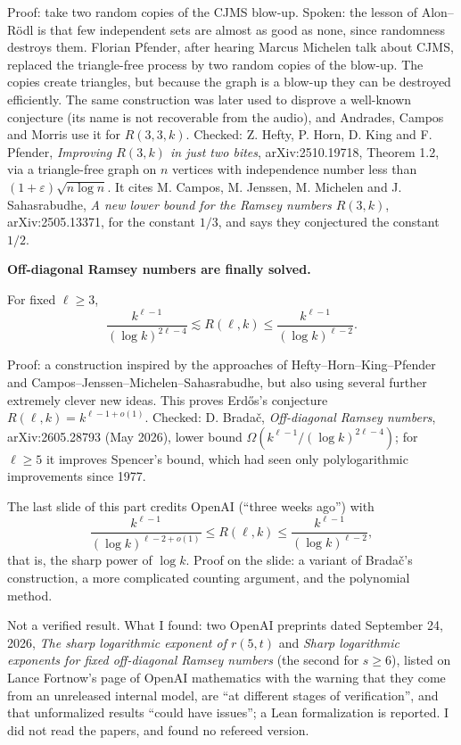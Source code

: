 \noindent
Proof: take two random copies of the CJMS
blow-up. Spoken: the lesson of Alon--R\"odl
is that few independent sets are almost as
good as none, since randomness destroys
them. Florian Pfender, after hearing Marcus
Michelen talk about CJMS, replaced the
triangle-free process by two random copies
of the blow-up. The copies create triangles,
but because the graph is a blow-up they can
be destroyed efficiently. The same
construction was later used to disprove a
well-known conjecture (its name is not
recoverable from the audio), and Andrades,
Campos and Morris use it for
$R(3,3,k)$. Checked: Z. Hefty, P. Horn,
D. King and F. Pfender, \emph{Improving
$R(3,k)$ in just two bites},
arXiv:2510.19718, Theorem 1.2, via a
triangle-free graph on $n$ vertices with
independence number less than
$(1+\varepsilon)\sqrt{n \log n}$. It cites
M. Campos, M. Jenssen, M. Michelen and
J. Sahasrabudhe, \emph{A new lower bound for
the Ramsey numbers $R(3,k)$},
arXiv:2505.13371, for the constant $1/3$,
and says they conjectured the constant
$1/2$.

\medskip\noindent
{\bf Off-diagonal Ramsey numbers are finally
solved.}

\begin{theorem}[Brada\v{c}, 2026+]
\label{theorem-bradac}
For fixed $\ell \ge 3$,
$$
\frac{k^{\ell-1}}{(\log k)^{2\ell-4}}
\lesssim R(\ell,k) \le
\frac{k^{\ell-1}}{(\log k)^{\ell-2}}.
$$
\end{theorem}

\noindent
Proof: a construction inspired by the
approaches of Hefty--Horn--King--Pfender and
Campos--Jenssen--Michelen--Sahasrabudhe, but
also using several further extremely clever
new ideas. This proves Erd\H{o}s's
conjecture $R(\ell,k) = k^{\ell-1+o(1)}$.
Checked: D. Brada\v{c}, \emph{Off-diagonal
Ramsey numbers}, arXiv:2605.28793 (May 2026),
lower bound
$\Omega(k^{\ell-1}/(\log k)^{2\ell-4})$; for
$\ell \ge 5$ it improves Spencer's bound,
which had seen only polylogarithmic
improvements since 1977.

\medskip\noindent
The last slide of this part credits OpenAI
(``three weeks ago'') with
$$
\frac{k^{\ell-1}}{(\log k)^{\ell-2+o(1)}}
\le R(\ell,k) \le
\frac{k^{\ell-1}}{(\log k)^{\ell-2}},
$$
that is, the sharp power of $\log k$. Proof
on the slide: a variant of Brada\v{c}'s
construction, a more complicated counting
argument, and the polynomial method.

\begin{remark}
\label{remark-openai-ramsey-status}
Not a verified result. What I found: two
OpenAI preprints dated September 24, 2026,
\emph{The sharp logarithmic exponent of
$r(5,t)$} and \emph{Sharp logarithmic
exponents for fixed off-diagonal Ramsey
numbers} (the second for $s \ge 6$), listed
on Lance Fortnow's page of OpenAI
mathematics with the warning that they come
from an unreleased internal model, are ``at
different stages of verification'', and
that unformalized results ``could have
issues''; a Lean formalization is reported.
I did not read the papers, and found no
refereed version.
\end{remark}

